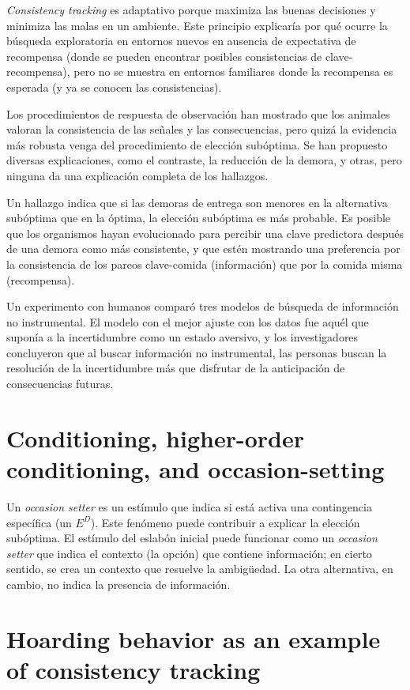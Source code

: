 \documentclass[a4paper,12pt]{article}
\begin{document}
{\itshape Consistency tracking} es adaptativo porque maximiza las buenas decisiones y minimiza las malas en un ambiente.
Este principio explicaría por qué ocurre la búsqueda exploratoria en entornos nuevos en ausencia de expectativa de recompensa (donde se pueden encontrar posibles consistencias de clave-recompensa), pero no se muestra en entornos familiares donde la recompensa es esperada (y ya se conocen las consistencias).

Los procedimientos de respuesta de observación han mostrado que los animales valoran la consistencia de las señales y las consecuencias, pero quizá la evidencia más robusta venga del procedimiento de elección subóptima.
Se han propuesto diversas explicaciones, como el contraste, la reducción de la demora, y otras, pero ninguna da una explicación completa de los hallazgos.

Un hallazgo indica que si las demoras de entrega son menores en la alternativa subóptima que en la óptima, la elección subóptima es más probable.
Es posible que los organismos hayan evolucionado para percibir una clave predictora después de una demora como más consistente, y que estén mostrando una preferencia por la consistencia de los pareos clave-comida (información) que por la comida misma (recompensa).

Un experimento con humanos comparó tres modelos de búsqueda de información no instrumental.
El modelo con el mejor ajuste con los datos fue aquél que suponía a la incertidumbre como un estado aversivo, y los investigadores concluyeron que al buscar información no instrumental, las personas buscan la resolución de la incertidumbre más que disfrutar de la anticipación de consecuencias futuras.

\section{Conditioning, higher-order conditioning, and occasion-setting}

Un {\itshape occasion setter} es un estímulo que indica si está activa una contingencia específica (un $E^{D}$).
Este fenómeno puede contribuir a explicar la elección subóptima.
El estímulo del eslabón inicial puede funcionar como un {\itshape occasion setter} que indica el contexto (la opción) que contiene información; en cierto sentido, se crea un contexto que resuelve la ambigüedad.
La otra alternativa, en cambio, no indica la presencia de información.

\section{Hoarding behavior as an example of consistency tracking}
\end{document}
